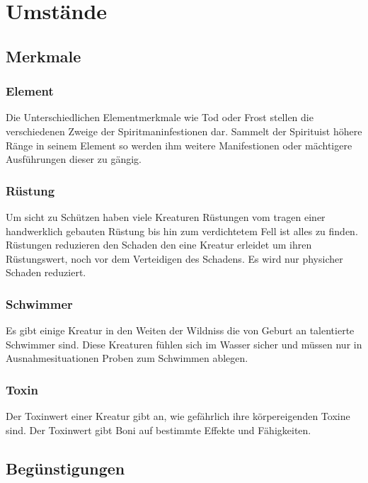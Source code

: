 \chapter{Umstände}

\section{Merkmale}

\subsection*{Element} \label{ef:element}
Die Unterschiedlichen Elementmerkmale wie Tod oder Frost stellen die verschiedenen Zweige der Spiritmaninfestionen dar. Sammelt der Spirituist höhere Ränge in seinem Element so werden ihm weitere Manifestionen oder mächtigere Ausführungen dieser zu gängig.

\subsection*{Rüstung} \label{ef:ruestung}
Um sicht zu Schützen haben viele Kreaturen Rüstungen vom tragen einer handwerklich gebauten Rüstung bis hin zum verdichtetem Fell ist alles zu finden. Rüstungen reduzieren den Schaden den eine Kreatur erleidet um ihren Rüstungswert, noch vor dem Verteidigen des Schadens. Es wird nur physicher Schaden reduziert.

\subsection*{Schwimmer} \label{ef:schwimmer}
Es gibt einige Kreatur in den Weiten der Wildniss die von Geburt an talentierte Schwimmer sind. Diese Kreaturen fühlen sich im Wasser sicher und müssen nur in Ausnahmesituationen Proben zum Schwimmen ablegen.

\subsection*{Toxin} \label{ef:toxin}
Der Toxinwert einer Kreatur gibt an, wie gefährlich ihre körpereigenden Toxine sind. Der Toxinwert gibt Boni auf bestimmte Effekte und Fähigkeiten.

\break

\section{Begünstigungen}

